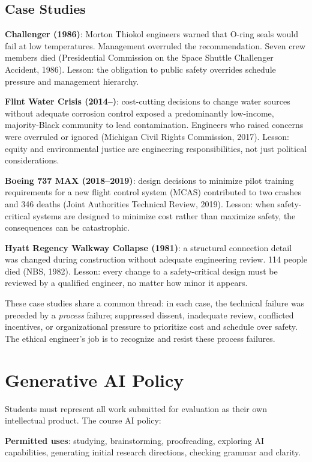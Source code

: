 \subsection{Case Studies}
\textbf{Challenger (1986)}: Morton Thiokol engineers warned that O-ring seals would fail at low temperatures. Management overruled the recommendation. Seven crew members died (Presidential Commission on the Space Shuttle Challenger Accident, 1986). Lesson: the obligation to public safety overrides schedule pressure and management hierarchy.

\textbf{Flint Water Crisis (2014--)}: cost-cutting decisions to change water sources without adequate corrosion control exposed a predominantly low-income, majority-Black community to lead contamination. Engineers who raised concerns were overruled or ignored (Michigan Civil Rights Commission, 2017). Lesson: equity and environmental justice are engineering responsibilities, not just political considerations.

\textbf{Boeing 737 MAX (2018--2019)}: design decisions to minimize pilot training requirements for a new flight control system (MCAS) contributed to two crashes and 346 deaths (Joint Authorities Technical Review, 2019). Lesson: when safety-critical systems are designed to minimize cost rather than maximize safety, the consequences can be catastrophic.

\textbf{Hyatt Regency Walkway Collapse (1981)}: a structural connection detail was changed during construction without adequate engineering review. 114 people died (NBS, 1982). Lesson: every change to a safety-critical design must be reviewed by a qualified engineer, no matter how minor it appears.

These case studies share a common thread: in each case, the technical failure was preceded by a \emph{process} failure; suppressed dissent, inadequate review, conflicted incentives, or organizational pressure to prioritize cost and schedule over safety. The ethical engineer's job is to recognize and resist these process failures.

\section{Generative AI Policy}
Students must represent all work submitted for evaluation as their own intellectual product. The course AI policy:

\textbf{Permitted uses}: studying, brainstorming, proofreading, exploring AI capabilities, generating initial research directions, checking grammar and clarity.


